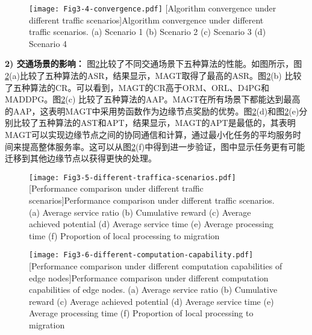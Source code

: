 \begin{figure}[h]
\centering
  \texttt{[image: Fig3-4-convergence.pdf]}
  [Algorithm convergence under different traffic scenarios]{Algorithm convergence under different traffic scenarios. (a) Scenario 1 (b) Scenario 2 (c) Scenario 3 (d) Scenario 4}
  \label{fig 3-4}
\end{figure} 

\textbf{2) 交通场景的影响：} 图\ref{fig 3-5}比较了不同交通场景下五种算法的性能。如图所示，图\ref{fig 3-5}(a)比较了五种算法的ASR，结果显示，MAGT取得了最高的ASR。图\ref{fig 3-5}(b) 比较了五种算法的CR。可以看到，MAGT的CR高于ORM、ORL、D4PG和MADDPG。图\ref{fig 3-5}(c) 比较了五种算法的AAP。MAGT在所有场景下都能达到最高的AAP，这表明MAGT中采用势函数作为边缘节点奖励的优势。图\ref{fig 3-5}(d)和图\ref{fig 3-5}(e)分别比较了五种算法的AST和APT，结果显示，MAGT的APT是最低的，其表明MAGT可以实现边缘节点之间的协同通信和计算，通过最小化任务的平均服务时间来提高整体服务率。这可以从图\ref{fig 3-5}(f)中得到进一步验证，图中显示任务更有可能迁移到其他边缘节点以获得更快的处理。

\begin{figure}[h]
\centering
  \texttt{[image: Fig3-5-different-traffica-scenarios.pdf]}
  [Performance comparison under different traffic scenarios]{Performance comparison under different traffic scenarios. (a) Average service ratio (b) Cumulative reward (c) Average achieved potential (d) Average service time (e) Average processing time (f) Proportion of local processing to migration}
  \label{fig 3-5}
\end{figure}

\begin{figure}[h]
\centering
  \texttt{[image: Fig3-6-different-computation-capability.pdf]}
  [Performance comparison under different computation capabilities of edge nodes]{Performance comparison under different computation capabilities of edge nodes. (a) Average service ratio (b) Cumulative reward (c) Average achieved potential (d) Average service time (e) Average processing time (f) Proportion of local processing to migration}
  \label{fig 3-6}
\end{figure}

